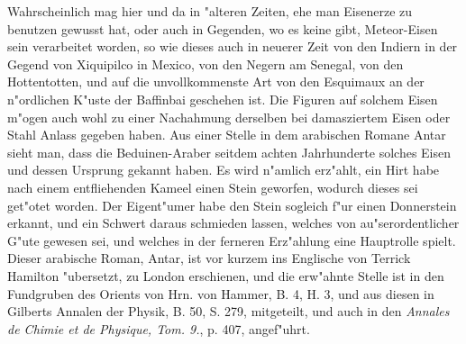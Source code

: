 \documentclass[a4paper, 11pt, oneside, polutonikogreek, german]{article}
\begin{document}
Wahrscheinlich mag hier und da in "alteren Zeiten, ehe man Eisenerze zu benutzen gewusst hat, oder auch in Gegenden, wo es keine gibt, Meteor-Eisen sein verarbeitet worden, so wie dieses auch in neuerer Zeit von den Indiern in der Gegend von Xiquipilco in Mexico, von den Negern am Senegal, von den Hottentotten, und auf die unvollkommenste Art von den Esquimaux an der n"ordlichen K"uste der Baffinbai geschehen ist. Die Figuren auf solchem Eisen m"ogen auch wohl zu einer Nachahmung derselben bei damasziertem Eisen oder Stahl Anlass gegeben haben. Aus einer Stelle in dem arabischen Romane Antar sieht man, dass die Beduinen-Araber seitdem achten Jahrhunderte solches Eisen und dessen Ursprung gekannt haben. Es wird n"amlich erz"ahlt, ein Hirt habe nach einem entfliehenden Kameel einen Stein geworfen, wodurch dieses sei get"otet worden. Der Eigent"umer habe den Stein sogleich f"ur einen Donnerstein erkannt, und ein Schwert daraus schmieden lassen, welches von au"serordentlicher G"ute gewesen sei, und welches in der ferneren Erz"ahlung eine Hauptrolle spielt. Dieser arabische Roman, Antar, ist vor kurzem ins Englische von Terrick Hamilton "ubersetzt, zu London erschienen, und die erw"ahnte Stelle ist in den Fundgruben des Orients von Hrn. von Hammer, B. 4, H. 3, und aus diesen in Gilberts Annalen der Physik, B. 50, S. 279, mitgeteilt, und auch in den \emph{Annales de Chimie et de Physique, Tom. 9.}, p. 407, angef"uhrt.
\subsection{}
\end{document}
